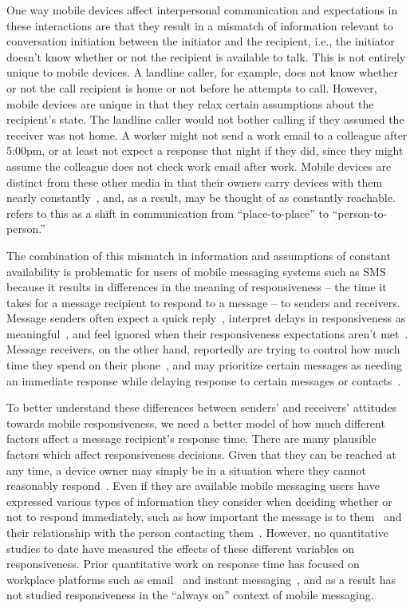 \documentclass[12pt]{nuthesis}	%
\begin{document}
One way mobile devices affect interpersonal communication and expectations in these interactions are that they result in a mismatch of information relevant to conversation initiation between the initiator and the recipient, i.e., the initiator doesn't know whether or not the recipient is available to talk. This is not entirely unique to mobile devices. A landline caller, for example, does not know whether or not the call recipient is home or not before he attempts to call. However, mobile devices are unique in that they relax certain assumptions about the recipient's state. The landline caller would not bother calling if they assumed the receiver was not home. A worker might not send a work email to a colleague after 5:00pm, or at least not expect a response that night if they did, since they might assume the colleague does not check work email after work. Mobile devices are distinct from these other media in that their owners carry devices with them nearly constantly~\citep{oksman2003perhaps,rainie2015americans,turkle2008always}, and, as a result, may be thought of as constantly reachable. \citet{wellman2001computer} refers to this as a shift in communication from ``place-to-place'' to ``person-to-person.''

The combination of this mismatch in information and assumptions of constant availability is problematic for users of mobile messaging systems such as SMS because it results in differences in the meaning of responsiveness -- the time it takes for a message recipient to respond to a message -- to senders and receivers. Message senders often expect a quick reply~\citep{laursen2005please}, interpret delays in responsiveness as meaningful~\citep{rettie2009mobile}, and feel ignored when their responsiveness expectations aren't met~\citep{church2013s}. Message receivers, on the other hand, reportedly are trying to control how much time they spend on their phone~\citep{ames2013managing,smith2015us}, and may prioritize certain messages as needing an immediate response while delaying response to certain messages or contacts~\citep{cui2016beyond,wohn2015ambient}.

To better understand these differences between senders' and receivers' attitudes towards mobile responsiveness, we need a better model of how much different factors affect a message recipient's response time. There are many plausible factors which affect responsiveness decisions. Given that they can be reached at any time, a device owner may simply be in a situation where they cannot reasonably respond~\citep{avrahami2007improving}. Even if they are available mobile messaging users have expressed various types of information they consider when deciding whether or not to respond immediately, such as how important the message is to them~\citep{cui2016beyond} and their relationship with the person contacting them~\citep{wohn2015ambient}. However, no quantitative studies to date have measured the effects of these different variables on responsiveness. Prior quantitative work on response time has focused on workplace platforms such as email~\citep{dabbish2005understanding} and instant messaging~\citep{avrahami2006responsiveness,avrahami2008waiting}, and as a result has not studied responsiveness in the ``always on'' context of mobile messaging.
\end{document}
